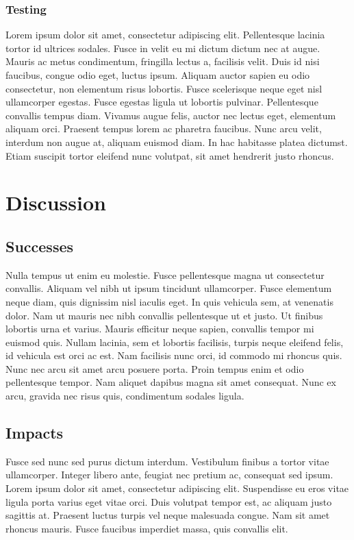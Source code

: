 \subsection{Testing}
Lorem ipsum dolor sit amet, consectetur adipiscing elit. Pellentesque lacinia tortor id ultrices sodales. Fusce in velit eu mi dictum dictum nec at augue. Mauris ac metus condimentum, fringilla lectus a, facilisis velit. Duis id nisi faucibus, congue odio eget, luctus ipsum. Aliquam auctor sapien eu odio consectetur, non elementum risus lobortis. Fusce scelerisque neque eget nisl ullamcorper egestas. Fusce egestas ligula ut lobortis pulvinar. Pellentesque convallis tempus diam. Vivamus augue felis, auctor nec lectus eget, elementum aliquam orci. Praesent tempus lorem ac pharetra faucibus. Nunc arcu velit, interdum non augue at, aliquam euismod diam. In hac habitasse platea dictumst. Etiam suscipit tortor eleifend nunc volutpat, sit amet hendrerit justo rhoncus.


\chapter{Discussion}

\section{Successes}
Nulla tempus ut enim eu molestie. Fusce pellentesque magna ut consectetur convallis. Aliquam vel nibh ut ipsum tincidunt ullamcorper. Fusce elementum neque diam, quis dignissim nisl iaculis eget. In quis vehicula sem, at venenatis dolor. Nam ut mauris nec nibh convallis pellentesque ut et justo. Ut finibus lobortis urna et varius. Mauris efficitur neque sapien, convallis tempor mi euismod quis. Nullam lacinia, sem et lobortis facilisis, turpis neque eleifend felis, id vehicula est orci ac est. Nam facilisis nunc orci, id commodo mi rhoncus quis. Nunc nec arcu sit amet arcu posuere porta. Proin tempus enim et odio pellentesque tempor. Nam aliquet dapibus magna sit amet consequat. Nunc ex arcu, gravida nec risus quis, condimentum sodales ligula.

\section{Impacts}
Fusce sed nunc sed purus dictum interdum. Vestibulum finibus a tortor vitae ullamcorper. Integer libero ante, feugiat nec pretium ac, consequat sed ipsum. Lorem ipsum dolor sit amet, consectetur adipiscing elit. Suspendisse eu eros vitae ligula porta varius eget vitae orci. Duis volutpat tempor est, ac aliquam justo sagittis at. Praesent luctus turpis vel neque malesuada congue. Nam sit amet rhoncus mauris. Fusce faucibus imperdiet massa, quis convallis elit.

